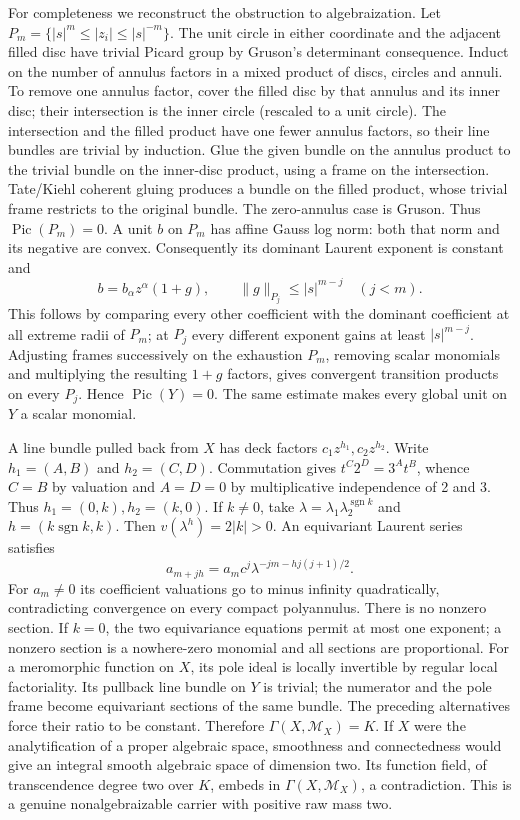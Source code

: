 \documentclass[11pt]{article}
\begin{document}
For completeness we reconstruct the obstruction to algebraization.
Let $P_m=\{|s|^m\le |z_i|\le |s|^{-m}\}$.
The unit circle in either coordinate and the adjacent filled disc have trivial
Picard group by Gruson's determinant consequence. Induct on the number of annulus factors in a mixed product of discs,
circles and annuli. To remove one annulus factor, cover the filled disc by
that annulus and its inner disc; their intersection is the inner circle
(rescaled to a unit circle). The intersection and the filled product have
one fewer annulus factors, so their line bundles are trivial by induction.
Glue the given bundle on the annulus product to the trivial bundle on the
inner-disc product, using a frame on the intersection. Tate/Kiehl coherent
gluing produces a bundle on the filled product, whose trivial frame restricts
to the original bundle. The zero-annulus case is Gruson. Thus
$\operatorname{Pic}(P_m)=0$.
A unit $b$ on $P_m$ has affine Gauss log norm: both that norm and its negative
are convex. Consequently its dominant Laurent exponent is constant and
\[
 b=b_\alpha z^\alpha(1+g),\qquad
 \|g\|_{P_j}\le |s|^{m-j}\quad(j<m).
\]
This follows by comparing every other coefficient with the dominant coefficient
at all extreme radii of $P_m$; at $P_j$ every different exponent gains at
least $|s|^{m-j}$. Adjusting frames successively on the exhaustion $P_m$,
removing scalar monomials and multiplying the resulting $1+g$ factors, gives
convergent transition products on every $P_j$. Hence
$\operatorname{Pic}(Y)=0$. The same estimate makes every global unit on $Y$
a scalar monomial.

A line bundle pulled back from $X$ has deck factors $c_1z^{h_1},c_2z^{h_2}$.
Write $h_1=(A,B)$ and $h_2=(C,D)$. Commutation gives
$t^C2^D=3^At^B$, whence $C=B$ by valuation and $A=D=0$ by multiplicative
independence of 2 and 3. Thus $h_1=(0,k),h_2=(k,0)$.
If $k\ne0$, take $\lambda=\lambda_1\lambda_2^{\operatorname{sgn}k}$ and
$h=(k\operatorname{sgn}k,k)$. Then $v(\lambda^h)=2|k|>0$.
An equivariant Laurent series satisfies
\[
 a_{m+jh}=a_m c^j\lambda^{-jm-hj(j+1)/2}.
\]
For $a_m\ne0$ its coefficient valuations go to minus infinity quadratically,
contradicting convergence on every compact polyannulus. There is no nonzero
section. If $k=0$, the two equivariance equations permit at most one exponent;
a nonzero section is a nowhere-zero monomial and all sections are proportional.
For a meromorphic function on $X$, its pole ideal is locally invertible by
regular local factoriality. Its pullback line bundle on $Y$ is trivial; the
numerator and the pole frame become equivariant sections of the same bundle.
The preceding alternatives force their ratio to be constant. Therefore
$\Gamma(X,\mathcal M_X)=K$. If $X$ were the analytification of a proper
algebraic space, smoothness and connectedness would give an integral smooth
algebraic space of dimension two. Its function field, of transcendence degree
two over $K$, embeds in $\Gamma(X,\mathcal M_X)$, a contradiction.
This is a genuine nonalgebraizable carrier with positive raw mass two.
\end{document}
